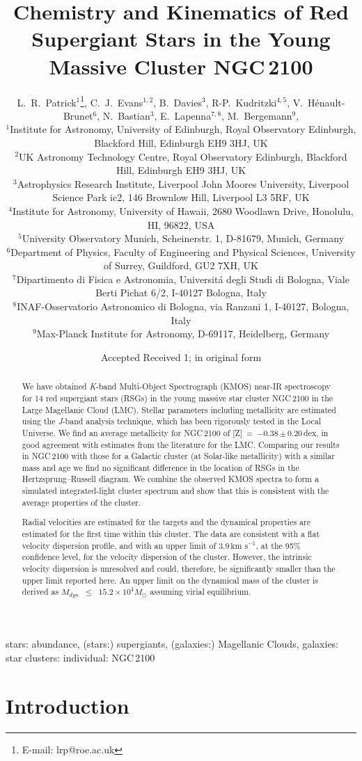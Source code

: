 \documentclass[useAMS,usenatbib]{mn2e}
\title[Chemistry and Kinematics of NGC\,2100]{Chemistry and Kinematics of Red Supergiant Stars in the Young Massive Cluster NGC\,2100}
\author[L.~R.~Patrick et al.]{L.~R.~Patrick$^{1}$\thanks{E-mail: lrp@roe.ac.uk},
C.~J.~Evans$^{1, 2}$,
B.~Davies$^{3}$,
R-P.~Kudritzki$^{4,5}$,
V.~H{\'e}nault-Brunet$^{6}$,
\newauthor N.~Bastian$^{3}$,
E.~Lapenna$^{7,8}$, M.~Bergemann$^{9}$,\\
$^{1}$Institute for Astronomy, University of Edinburgh, Royal Observatory Edinburgh, Blackford Hill, Edinburgh EH9 3HJ, UK\\
$^{2}$UK Astronomy Technology Centre, Royal Observatory Edinburgh, Blackford Hill, Edinburgh EH9 3HJ, UK\\
$^{3}$Astrophysics Research Institute, Liverpool John Moores University, Liverpool Science Park ic2, 146 Brownlow Hill, Liverpool L3 5RF, UK\\
$^{4}$Institute for Astronomy, University of Hawaii, 2680 Woodlawn Drive, Honolulu, HI, 96822, USA\\
$^{5}$University Observatory Munich, Scheinerstr. 1, D-81679, Munich, Germany\\
$^{6}$Department of Physics, Faculty of Engineering and Physical Sciences, University of Surrey, Guildford, GU2 7XH, UK\\
$^{7}$Dipartimento di Fisica e Astronomia, Universit\'a degli Studi di Bologna, Viale Berti Pichat 6/2, I-40127 Bologna, Italy\\
$^{8}$INAF-Osservatorio Astronomico di Bologna, via Ranzani 1, I-40127, Bologna, Italy\\
$^{9}$Max-Planck Institute for Astronomy, D-69117, Heidelberg, Germany\\
}
\def\kms{$\mbox{km s}^{-1}$}
\begin{document}
\date{Accepted  Received 1; in original form}

\pagerange{\pageref{firstpage}--\pageref{lastpage}} 

\maketitle

\label{firstpage}

\begin{abstract}

\noindent We have obtained {\it K}-band Multi-Object Spectrograph (KMOS) near-IR spectroscopy for 14 red supergiant stars (RSGs) in the young massive star cluster NGC\,2100 in the Large Magellanic Cloud (LMC).
Stellar parameters including metallicity are estimated using the {\it J}-band analysis technique, which has been rigorously tested in the Local Universe.
We find an average metallicity for NGC\,2100 of [Z]~=~$-$0.38\,$\pm$\,0.20\,dex, in good agreement with estimates from the literature for the LMC.
Comparing our results in NGC\,2100 with those for a Galactic cluster (at Solar-like metallicity) with a similar mass and age we find no significant difference in the location of RSGs in the Hertzsprung--Russell diagram.
We combine the observed KMOS spectra to form a simulated integrated-light cluster spectrum and show that this is consistent with the average properties of the cluster.

Radial velocities are estimated for the targets and the dynamical properties are estimated for the first time within this cluster.
The data are consistent with a flat velocity dispersion profile, and with an upper limit of 3.9\,\kms, at the 95\% confidence level, for the velocity dispersion of the cluster.
However, the intrinsic velocity dispersion is unresolved and could, therefore, be significantly smaller than the upper limit reported here.
An upper limit on the dynamical mass of the cluster is derived as
$M_{dyn}$~$\le$~$15.2\times10^{4}M_{\odot}$ assuming virial equilibrium.
\end{abstract}

\begin{keywords}
stars: abundance, (stars:) supergiants, (galaxies:) Magellanic Clouds, galaxies: star clusters: individual: NGC\,2100
\end{keywords}

\section{Introduction} %
\label{sec:introduction}
\end{document}

